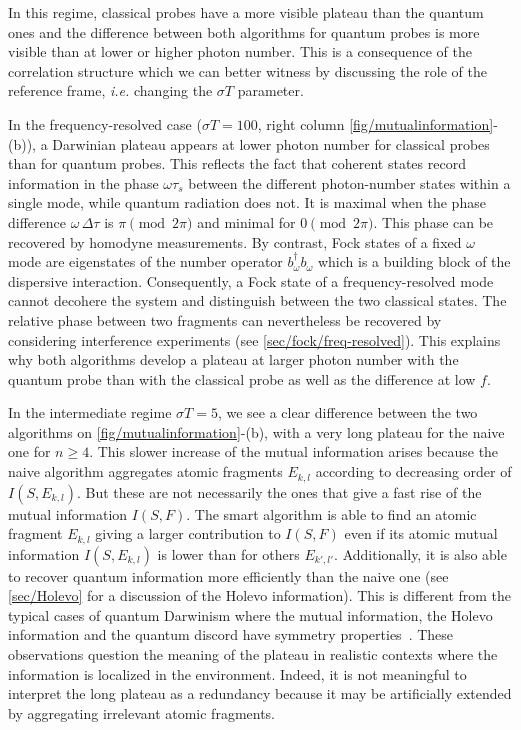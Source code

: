 In this regime, classical probes have a more visible plateau than
the quantum ones and the difference between both algorithms 
for quantum probes is more visible than at lower or higher photon 
number. This is a consequence of the correlation structure which
we can better witness by discussing the role of the reference frame, 
\textit{i.e.} changing the $\sigma T$ parameter.

In the frequency-resolved case
($\sigma T =100$, right column \cref{fig/mutualinformation}-(b)), a 
Darwinian plateau appears at lower photon number
for classical probes than for quantum probes. This reflects the fact
that coherent states record information in the phase $\omega\tau_s$ 
between the different photon-number states within a single mode,
while quantum radiation does not. 
It is maximal when the phase difference
$\omega\,\Delta\tau$ is $\pi\pmod{2\pi}$ and minimal for
$0\pmod{2\pi}$. This phase can be recovered by homodyne measurements. 
By contrast, Fock states of a fixed $\omega$ mode are eigenstates 
of the number operator $b^\dagger_\omega b_\omega$ which is a building block of 
the dispersive interaction.
Consequently, a Fock state of a frequency-resolved mode cannot decohere 
the system and distinguish between the two classical states. The relative 
phase between two fragments can nevertheless be recovered by considering
interference experiments (see \cref{sec/fock/freq-resolved}). 
This explains why both algorithms develop 
a plateau at larger photon number with the quantum probe than with the 
classical probe as well as the difference at low $f$.

In the intermediate regime $\sigma T=5$, we see a clear difference 
between the two algorithms on \cref{fig/mutualinformation}-(b),
with a very long plateau for the naive one for $n\geq 4$. 
%
This slower increase of the mutual information arises because the naive 
algorithm aggregates atomic fragments $E_{k,l}$ according to decreasing
order of $I(S,E_{k,l})$. But these are not necessarily the ones that give a fast
rise of the mutual information $I(S,F)$. The smart algorithm is able 
to find an atomic fragment $E_{k,l}$ giving a larger contribution to $I(S,F)$
even if its atomic mutual information $I(S,E_{k,l})$ is lower than for others
$E_{k',l'}$. Additionally, it is also able to recover quantum information 
more efficiently than the naive one 
(see \cref{sec/Holevo} for a discussion of the Holevo information). This
is different from the typical cases of quantum Darwinism where the 
mutual information, the Holevo information and the
quantum discord have symmetry properties~\cite{Zurek-2013}. These
observations question the meaning of the plateau in realistic contexts 
where the information is localized in the environment. 
Indeed, it is not meaningful to interpret the long plateau 
as a redundancy because it may be artificially extended by aggregating
irrelevant atomic fragments. 

